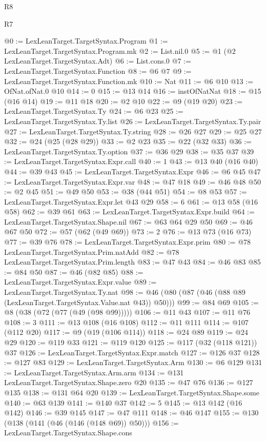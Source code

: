 \begin{lexlean}{R8}
\begin{lexlean}{R7}
\begin{coremodule}
{{{{{{{{{{{{{{{{{{{{@0 := LexLeanTarget.TargetSyntax.Program
@1 := LexLeanTarget.TargetSyntax.Program.mk
@2 := List.nil.{0}
@5 := @1 (@2 LexLeanTarget.TargetSyntax.Adt)
@6 := List.cons.{0}
@7 := LexLeanTarget.TargetSyntax.Function
@8 := @6 @7
@9 := LexLeanTarget.TargetSyntax.Function.mk
@10 := Nat
@11 := @6 @10
@13 := OfNat.ofNat.{0} @10
@14 := 0
@15 := @13 @14
@16 := instOfNatNat
@18 := @15 (@16 @14)
@19 := @11 @18
@20 := @2 @10
@22 := @9 (@19 @20)
@23 := LexLeanTarget.TargetSyntax.Ty
@24 := @6 @23
@25 := LexLeanTarget.TargetSyntax.Ty.list
@26 := LexLeanTarget.TargetSyntax.Ty.pair
@27 := LexLeanTarget.TargetSyntax.Ty.string
@28 := @26 @27
@29 := @25 @27
@32 := @24 (@25 (@28 @29))
@33 := @2 @23
@35 := @22 (@32 @33)
@36 := LexLeanTarget.TargetSyntax.Ty.option
@37 := @36 @29
@38 := @35 @37
@39 := LexLeanTarget.TargetSyntax.Expr.call
@40 := 1
@43 := @13 @40 (@16 @40)
@44 := @39 @43
@45 := LexLeanTarget.TargetSyntax.Expr
@46 := @6 @45
@47 := LexLeanTarget.TargetSyntax.Expr.var
@48 := @47 @18
@49 := @46 @48
@50 := @2 @45
@51 := @49 @50
@53 := @38 (@44 @51)
@54 := @8 @53
@57 := LexLeanTarget.TargetSyntax.Expr.let @43 @29
@58 := 6
@61 := @13 @58 (@16 @58)
@62 := @39 @61
@63 := LexLeanTarget.TargetSyntax.Expr.build
@64 := LexLeanTarget.TargetSyntax.Shape.nil
@67 := @63 @64 @29 @50
@69 := @46 @67 @50
@72 := @57 (@62 (@49 @69))
@73 := 2
@76 := @13 @73 (@16 @73)
@77 := @39 @76
@78 := LexLeanTarget.TargetSyntax.Expr.prim
@80 := @78 LexLeanTarget.TargetSyntax.Prim.natAdd
@82 := @78 LexLeanTarget.TargetSyntax.Prim.length
@83 := @47 @43
@84 := @46 @83
@85 := @84 @50
@87 := @46 (@82 @85)
@88 := LexLeanTarget.TargetSyntax.Expr.value
@89 := LexLeanTarget.TargetSyntax.Ty.nat
@98 := @46 (@80 (@87 (@46 (@88 @89 (LexLeanTarget.TargetSyntax.Value.nat @43)) @50)))
@99 := @84 @69
@105 := @8 (@38 (@72 (@77 (@49 (@98 @99)))))
@106 := @11 @43
@107 := @11 @76
@108 := 3
@111 := @13 @108 (@16 @108)
@112 := @11 @111
@114 := @107 (@112 @20)
@117 := @9 (@19 (@106 @114))
@118 := @24 @89
@119 := @24 @29
@120 := @119 @33
@121 := @119 @120
@125 := @117 (@32 (@118 @121)) @37
@126 := LexLeanTarget.TargetSyntax.Expr.match
@127 := @126 @37
@128 := @127 @83
@129 := LexLeanTarget.TargetSyntax.Arm
@130 := @6 @129
@131 := LexLeanTarget.TargetSyntax.Arm.arm
@134 := @131 LexLeanTarget.TargetSyntax.Shape.zero @20
@135 := @47 @76
@136 := @127 @135
@138 := @131 @64 @20
@139 := LexLeanTarget.TargetSyntax.Shape.some
@140 := @63 @139
@141 := @140 @37
@142 := 5
@145 := @13 @142 (@16 @142)
@146 := @39 @145
@147 := @47 @111
@148 := @46 @147
@155 := @130 (@138 (@141 (@46 (@146 (@148 @69)) @50)))
@156 := LexLeanTarget.TargetSyntax.Shape.cons
}}}}}}}}}}}}}}}}}}}}
\end{coremodule}
\end{lexlean}
\end{lexlean}
